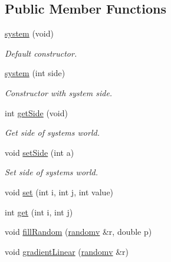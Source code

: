 \subsection*{Public Member Functions}
\begin{DoxyCompactItemize}
\item 
\mbox{\label{classsystem_a8e1d6ac8f175a0069a3c5cbcbe058ed9}} 
\hyperlink{classsystem_a8e1d6ac8f175a0069a3c5cbcbe058ed9}{system} (void)
\begin{DoxyCompactList}\small\item\em Default constructor. \end{DoxyCompactList}\item 
\mbox{\label{classsystem_a1792d5fc1f824113d7852a8f99416495}} 
\hyperlink{classsystem_a1792d5fc1f824113d7852a8f99416495}{system} (int side)
\begin{DoxyCompactList}\small\item\em Constructor with system side. \end{DoxyCompactList}\item 
\mbox{\label{classsystem_a7480d03afdf71f4e1afc757a323faf6c}} 
int \hyperlink{classsystem_a7480d03afdf71f4e1afc757a323faf6c}{get\+Side} (void)
\begin{DoxyCompactList}\small\item\em Get side of system\textquotesingle{}s world. \end{DoxyCompactList}\item 
\mbox{\label{classsystem_ae139efd3a2598bc297b9224868058d7d}} 
void \hyperlink{classsystem_ae139efd3a2598bc297b9224868058d7d}{set\+Side} (int a)
\begin{DoxyCompactList}\small\item\em Set side of system\textquotesingle{}s world. \end{DoxyCompactList}\item 
void \hyperlink{classsystem_a0c16c03ebc2912428bb83ec8310533d3}{set} (int i, int j, int value)
\item 
int \hyperlink{classsystem_a515cbef246f97a9eb89ce36324fee14e}{get} (int i, int j)
\item 
void \hyperlink{classsystem_a774fdf388271bf46bf1125cc186e32d6}{fill\+Random} (\hyperlink{classrandomv}{randomv} \&r, double p)
\item 
void \hyperlink{classsystem_a720cb2d9e63c4ae5a704e912359ad009}{gradient\+Linear} (\hyperlink{classrandomv}{randomv} \&r)

\end{DoxyCompactItemize}

